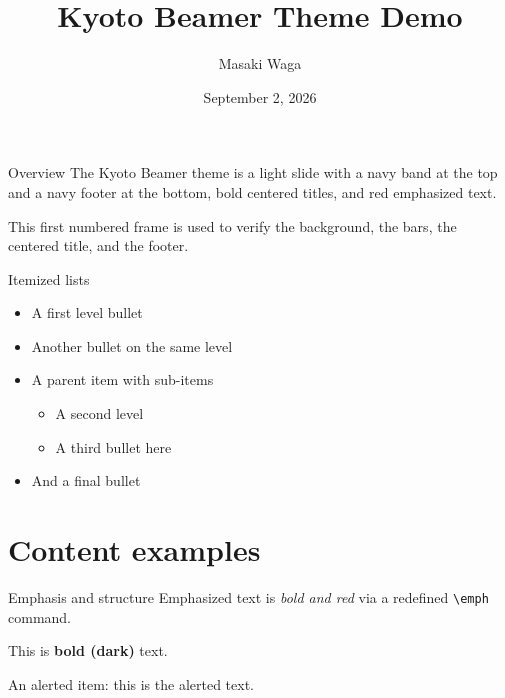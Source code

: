 \documentclass[aspectratio=169]{beamer}
\title{Kyoto Beamer Theme Demo}
\author[M. Waga]{Masaki Waga}
\institute{Kyoto University}
\date{September 2, 2026}
\begin{document}
\begin{frame}[noframenumbering]
  \titlepage
\end{frame}

\begin{frame}{Overview}
  The Kyoto Beamer theme is a light slide with a navy band at the top
  and a navy footer at the bottom, bold centered titles, and red
  emphasized text.

  \medskip
  This first numbered frame is used to verify the background, the bars,
  the centered title, and the footer.
\end{frame}

\begin{frame}{Itemized lists}
  \begin{itemize}
    \item A first level bullet
    \item Another bullet on the same level
    \item A parent item with sub-items
      \begin{itemize}
        \item A second level
        \item A third bullet here
      \end{itemize}
    \item And a final bullet
  \end{itemize}
\end{frame}

\section{Content examples}
\begin{frame}[noframenumbering]
  \sectionpage
\end{frame}

\begin{frame}{Emphasis and structure}
  Emphasized text is \emph{bold and red} via a redefined
  \texttt{\textbackslash emph} command.

  \medskip
  This is \textbf{bold (dark)} text.

  \medskip
  An alerted item: \alert{this is the alerted text}.
\end{frame}
\end{document}

